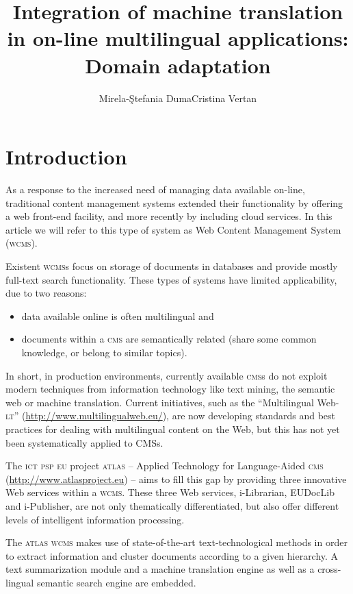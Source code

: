 \documentclass[output=paper]{LSP/langsci}
\author{Mirela-Ştefania Duma\lastand Cristina Vertan\affiliation{University of Hamburg, Germany} }
\title{Integration of machine translation in on-line multilingual applications: Domain adaptation}
\begin{document}


\section{Introduction}\label{sec:dumavertan:1}

As a response to the increased need of managing data available on-line, traditional content management systems extended their functionality by offering a web front-end facility, and more recently by including cloud services. In this article we will refer to this type of system as Web Content Management System (\textsc{wcms}). 

Existent \textsc{wcms}s focus on storage of documents in databases and provide mostly full-text search functionality. These types of systems have limited applicability, due to two reasons: 

\begin{itemize}
\item 
data available online is often multilingual and 
\item 
documents within a \textsc{cms} are semantically related (share some common knowledge, or belong to similar topics). 
\end{itemize}

In short, in production environments, currently available \textsc{cms}s do not exploit modern techniques from information technology like text mining, the semantic web or machine translation. Current initiatives, such as the ``Multilingual Web-\textsc{lt}'' (\url{http://www.multilingualweb.eu/}), are now developing standards and best practices for dealing with multilingual content on the Web, but this has not yet been systematically applied to \textsc{CMS}s.

The \textsc{ict psp eu} project \textsc{atlas} -- Applied Technology for Language-Aided \textsc{cms} (\url{http://www.atlasproject.eu}) -- aims to fill this gap by providing three innovative Web services within a \textsc{wcms}. These three Web services, i-Librarian, EUDocLib and i-Publisher, are not only thematically differentiated, but  also offer  different levels of intelligent information processing. 

The \textsc{atlas} \textsc{wcms} makes use of state-of-the-art text-technological methods in order to extract information and cluster documents according to a given hierarchy. A text summarization module and a machine translation engine as well as a cross-lingual semantic search engine are embedded.  
\end{document}
